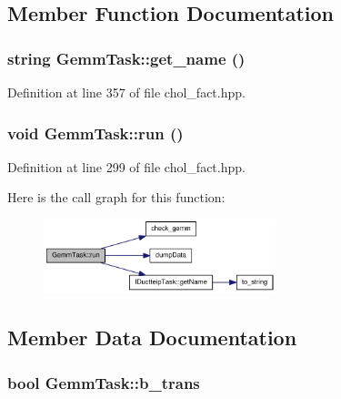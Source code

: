 \subsection{Member Function Documentation}
\hypertarget{struct_gemm_task_ac4724446924cdcf9cb5b2cbf9c01b4fd}{
\subsubsection[{get\_\-name}]{\setlength{\rightskip}{0pt plus 5cm}string GemmTask::get\_\-name ()}}
\label{struct_gemm_task_ac4724446924cdcf9cb5b2cbf9c01b4fd}


Definition at line 357 of file chol\_\-fact.hpp.\hypertarget{struct_gemm_task_a3b8ea26b6bf1116c292dc40b5f759386}{
\subsubsection[{run}]{\setlength{\rightskip}{0pt plus 5cm}void GemmTask::run ()}}
\label{struct_gemm_task_a3b8ea26b6bf1116c292dc40b5f759386}


Definition at line 299 of file chol\_\-fact.hpp.

Here is the call graph for this function:\nopagebreak
\begin{figure}[H]
\begin{center}
\leavevmode
\includegraphics[width=191pt]{struct_gemm_task_a3b8ea26b6bf1116c292dc40b5f759386_cgraph}
\end{center}
\end{figure}


\subsection{Member Data Documentation}
\hypertarget{struct_gemm_task_ae8b3fec03227068a541cb25ef4e9ed60}{
\subsubsection[{b\_\-trans}]{\setlength{\rightskip}{0pt plus 5cm}bool {\bf GemmTask::b\_\-trans}}}
\label{struct_gemm_task_ae8b3fec03227068a541cb25ef4e9ed60}


